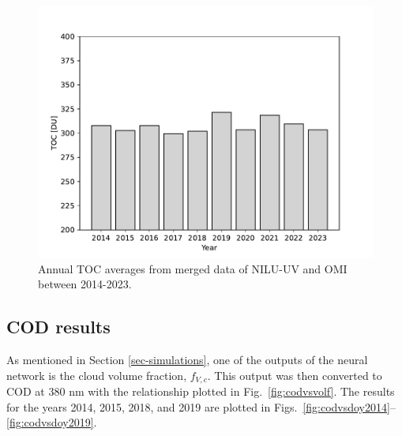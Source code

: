 \documentclass{optica-article}
\begin{document}
\begin{figure}[H]
	\centering
	\includegraphics[width=0.7\linewidth]{mergedTOC}
	\caption{Annual TOC averages from merged data of NILU-UV and OMI between 2014-2023.}
	\label{fig:mergedtoc}
\end{figure}


\subsection{COD results}
\label{sec-codresults}

As mentioned in Section \ref{sec-simulations}, one of the outputs of the neural network is the cloud volume fraction, $f_{V,c}$.  This output was then converted to COD at 380 nm with the relationship plotted in Fig.~\ref{fig:codvsvolf}. 
The results for the years 2014, 2015, 2018, and 2019 are plotted in Figs.~\ref{fig:codvsdoy2014}--\ref{fig:codvsdoy2019}.\\
\end{document}
